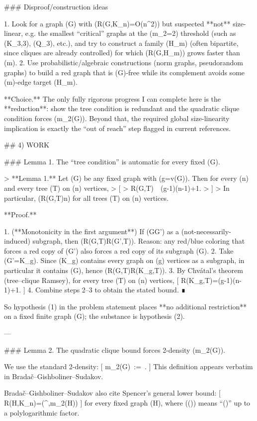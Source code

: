 ### Disproof/construction ideas

1. Look for a graph (G) with (R(G,K_n)=O(n^2)) but suspected **not** size-linear, e.g. the smallest “critical” graphs at the (m_2=2) threshold (such as (K_{3,3}), (Q_3), etc.), and try to construct a family (H_m) (often bipartite, since cliques are already controlled) for which (R(G,H_m)) grows faster than (m).
2. Use probabilistic/algebraic constructions (norm graphs, pseudorandom graphs) to build a red graph that is (G)-free while its complement avoids some (m)-edge target (H_m).

**Choice.** The only fully rigorous progress I can complete here is the **reduction**: show the tree condition is redundant and the quadratic clique condition forces (m_2(G)). Beyond that, the required global size-linearity implication is exactly the “out of reach” step flagged in current references.

## 4) WORK

### Lemma 1. The “tree condition” is automatic for every fixed (G).

> **Lemma 1.** Let (G) be any fixed graph with (g=v(G)). Then for every (n) and every tree (T) on (n) vertices,
> [
> R(G,T)\ \le\ (g-1)(n-1)+1.
> ]
> In particular, (R(G,T)\ll n) for all trees (T) on (n) vertices.

**Proof.**

1. (**Monotonicity in the first argument**) If (G\subseteq G') as a (not-necessarily-induced) subgraph, then (R(G,T)\le R(G',T)).
   Reason: any red/blue coloring that forces a red copy of (G') also forces a red copy of its subgraph (G).
2. Take (G'=K_g). Since (K_g) contains every graph on (g) vertices as a subgraph, in particular it contains (G), hence (R(G,T)\le R(K_g,T)).
3. By Chvátal’s theorem (tree–clique Ramsey), for every tree (T) on (n) vertices,
   [
   R(K_g,T)=(g-1)(n-1)+1.
   ]
4. Combine steps 2–3 to obtain the stated bound. ∎

So hypothesis (1) in the problem statement places **no additional restriction** on a fixed finite graph (G); the substance is hypothesis (2).

---

### Lemma 2. The quadratic clique bound forces 2-density (m_2(G)).

We use the standard 2-density:
[
m_2(G)\ :=\ \max{}.
]
This definition appears verbatim in Bradač–Gishboliner–Sudakov.

Bradač–Gishboliner–Sudakov also cite Spencer’s general lower bound:
[
R(H,K_n)=\Omega(^{,m_2(H)})
]
for every fixed graph (H), where (\Omega(\tilde{\cdot})) means “(\ge)” up to a polylogarithmic factor.

